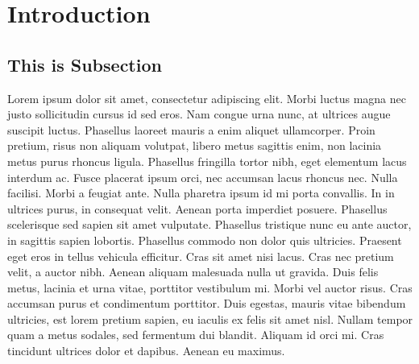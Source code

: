 \documentclass[11pt]{article}
\begin{document}
\clearpage
\section{Introduction}
\subsection{This is Subsection}

Lorem ipsum dolor sit amet, consectetur adipiscing elit. 
Morbi luctus magna nec justo sollicitudin cursus id sed eros. 
Nam congue urna nunc, at ultrices augue suscipit luctus. Phasellus
 laoreet mauris a enim aliquet ullamcorper. Proin pretium, risus non aliquam volutpat, libero metus sagittis enim, non lacinia metus purus rhoncus ligula. Phasellus fringilla tortor nibh, eget elementum lacus interdum ac. Fusce placerat ipsum orci, nec accumsan lacus rhoncus nec. Nulla facilisi. Morbi a feugiat ante. Nulla pharetra ipsum id mi porta convallis. In in ultrices purus, in consequat velit. Aenean porta imperdiet posuere. Phasellus scelerisque sed sapien sit amet vulputate. Phasellus tristique nunc eu ante auctor, in sagittis sapien lobortis. Phasellus commodo non dolor quis ultricies. Praesent eget eros in tellus vehicula efficitur. Cras sit amet nisi lacus. 
Cras nec pretium velit, a auctor nibh. Aenean aliquam malesuada nulla ut 
gravida. Duis felis metus, lacinia et urna vitae, porttitor vestibulum mi. 
Morbi vel auctor risus. Cras accumsan purus et condimentum porttitor. Duis egestas, 
mauris vitae bibendum ultricies, est lorem pretium sapien, eu iaculis ex felis sit amet nisl. 
Nullam tempor quam a metus sodales, sed fermentum dui blandit. Aliquam id orci mi. Cras 
tincidunt ultrices dolor et dapibus. Aenean eu maximus.
\end{document}
